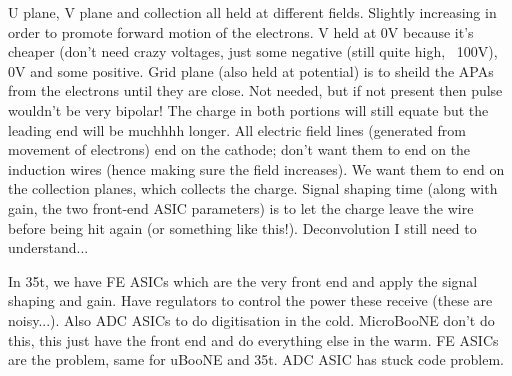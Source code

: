 U plane, V plane and collection all held at different fields.  Slightly increasing in order to promote forward motion of the electrons.  V held at 0V because it's cheaper (don't need crazy voltages, just some negative (still quite high, ~100V), 0V and some positive.
Grid plane (also held at potential) is to sheild the APAs from the electrons until they are close.  Not needed, but if not present then pulse wouldn't be very bipolar! The charge in both portions will still equate but the leading end will be muchhhh longer.  All electric field lines (generated from movement of electrons) end on the cathode; don't want them to end on the induction wires (hence making sure the field increases).  We want them to end on the collection planes, which collects the charge.  Signal shaping time (along with gain, the two front-end ASIC parameters) is to let the charge leave the wire before being hit again (or something like this!).  Deconvolution I still need to understand...


In 35t, we have FE ASICs which are the very front end and apply the signal shaping and gain.  Have regulators to control the power these receive (these are noisy...).  Also ADC ASICs to do digitisation in the cold.  MicroBooNE don't do this, this just have the front end and do everything else in the warm.  FE ASICs are the problem, same for uBooNE and 35t.  ADC ASIC has stuck code problem.

